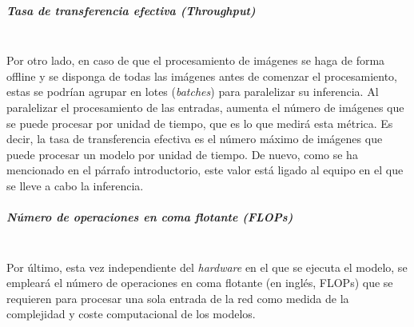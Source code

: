 \subparagraph{Tasa de transferencia efectiva \textit{(Throughput)}}\mbox{}\\
Por otro lado, en caso de que el procesamiento de imágenes se haga de forma offline y se disponga de todas las imágenes antes de comenzar el procesamiento, estas se podrían agrupar en lotes (\textit{batches}) para paralelizar su inferencia. Al paralelizar el procesamiento de las entradas, aumenta el número de imágenes que se puede procesar por unidad de tiempo, que es lo que medirá esta métrica. Es decir, la tasa de transferencia efectiva es el número máximo de imágenes que puede procesar un modelo por unidad de tiempo.
De nuevo, como se ha mencionado en el párrafo introductorio, este valor está ligado al equipo en el que se lleve a cabo la inferencia.

\subparagraph{Número de operaciones en coma flotante \textit{(FLOPs)}}\mbox{}\\
Por último, esta vez independiente del \textit{hardware} en el que se ejecuta el modelo, se empleará el número de operaciones en coma flotante (en inglés, FLOPs) que se requieren para procesar una sola entrada de la red como medida de la complejidad y coste computacional de los modelos.





\clearpage
